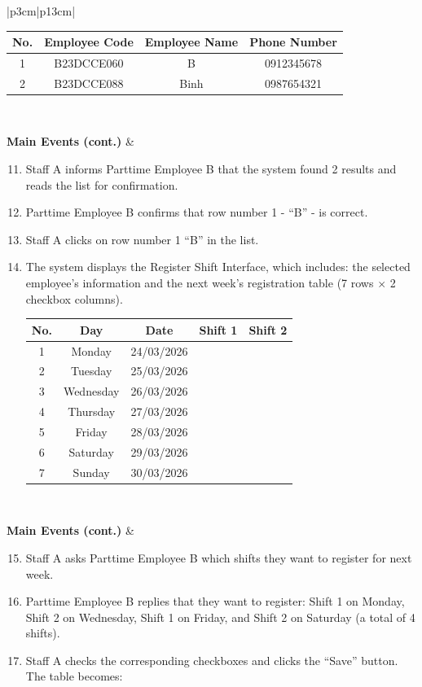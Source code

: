 \begin{longtable}{|p{3cm}|p{13cm}|}
\begin{enumerate}
    \begin{tabular}{|c|c|c|c|}
    \hline
    \textbf{No.} & \textbf{Employee Code} & \textbf{Employee Name} & \textbf{Phone Number} \\
    \hline
    1 & B23DCCE060 & B & 0912345678 \\
    \hline
    2 & B23DCCE088 & Binh & 0987654321 \\
    \hline
    \end{tabular}
\end{enumerate} \\
\hline

\textbf{Main Events (cont.)} &
\begin{enumerate}
    \setcounter{enumi}{10}
    \item Staff A informs Parttime Employee B that the system found 2 results and reads the list for confirmation.
    \item Parttime Employee B confirms that row number 1 - ``B'' - is correct.
    \item Staff A clicks on row number 1 ``B'' in the list.
    \item The system displays the Register Shift Interface, which includes: the selected employee's information and the next week's registration table (7 rows $\times$ 2 checkbox columns).

    \begin{tabular}{|c|c|c|c|c|}
    \hline
    \textbf{No.} & \textbf{Day} & \textbf{Date} & \textbf{Shift 1} & \textbf{Shift 2} \\
    \hline
    1 & Monday & 24/03/2026 & & \\
    \hline
    2 & Tuesday & 25/03/2026 & & \\
    \hline
    3 & Wednesday & 26/03/2026 & & \\
    \hline
    4 & Thursday & 27/03/2026 & & \\
    \hline
    5 & Friday & 28/03/2026 & & \\
    \hline
    6 & Saturday & 29/03/2026 & & \\
    \hline
    7 & Sunday & 30/03/2026 & & \\
    \hline
    \end{tabular}
\end{enumerate} \\
\hline

\textbf{Main Events (cont.)} &
\begin{enumerate}
    \setcounter{enumi}{14}
    \item Staff A asks Parttime Employee B which shifts they want to register for next week.
    \item Parttime Employee B replies that they want to register: Shift 1 on Monday, Shift 2 on Wednesday, Shift 1 on Friday, and Shift 2 on Saturday (a total of 4 shifts).
    \item Staff A checks the corresponding checkboxes and clicks the ``Save'' button. The table becomes:


\end{enumerate}
\end{longtable}
